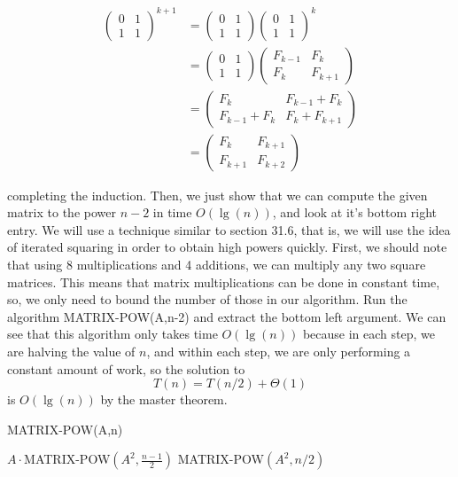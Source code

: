 \documentclass{article}
\begin{document}
\begin{enumerate}[a.]
\begin{align*}
\left( \begin{array}{cc}0&1\\1&1\end{array}\right)^{k+1} &= \left( \begin{array}{cc}0&1\\1&1\end{array}\right)\left( \begin{array}{cc}0&1\\1&1\end{array}\right)^{k}\\
&= \left( \begin{array}{cc}0&1\\1&1\end{array}\right)\left( \begin{array}{cc}F_{k-1}&F_{k}\\F_{k}&F_{k+1}\end{array}\right)\\
&=\left( \begin{array}{cc}F_k&F_{k-1} +F_k\\F_{k-1} + F_k&F_k + F_{k+1}\end{array}\right)\\
&=\left( \begin{array}{cc}F_k&F_{k+1}\\F_{k+1}&F_{k+2}\end{array}\right)
\end{align*}

completing the induction. Then, we just show that we can compute the given matrix to the power $n-2$ in time $O(\lg(n))$, and look at it's bottom right entry. We will use a technique similar to section 31.6, that is, we will use the idea of iterated squaring in order to obtain high powers quickly. First, we should note that using 8 multiplications and 4 additions, we can multiply any two square matrices. This means that matrix multiplications can be done in constant time, so, we only need to bound the number of those in our algorithm. Run the algorithm MATRIX-POW(A,n-2) and extract the bottom left argument. We can see that this algorithm only takes time $O(\lg(n))$ because in each step, we are halving the value of $n$, and within each step, we are only performing a constant amount of work, so the solution to 
\[
T(n) = T(n/2) + \Theta(1)
\]
is $O(\lg(n))$ by the master theorem.

\begin{algorithm}
\caption{MATRIX-POW(A,n)}
\begin{algorithmic}
\State \Return $A\cdot $MATRIX-POW$(A^2, \frac{n-1}{2})$
\Else
\State \Return MATRIX-POW$(A^2,n/2)$
\EndIf
\end{algorithmic}
\end{algorithm}


\end{enumerate}
\end{document}

